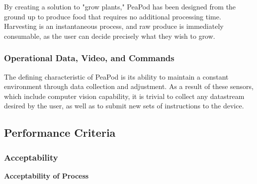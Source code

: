\documentclass{report}
\begin{document}

By creating a solution to "grow plants," PeaPod has been designed from the ground up to produce food that requires no additional processing time. Harvesting is an instantaneous process, and raw produce is immediately consumable, as the user can decide precisely what they wish to grow.

\subsubsection{Operational Data, Video, and Commands} 


The defining characteristic of PeaPod is its ability to maintain a constant environment through data collection and adjustment. As a result of these sensors, which include computer vision capability, it is trivial to collect any datastream desired by the user, as well as to submit new sets of instructions to the device.

\subsection{Performance Criteria}


\subsubsection{Acceptability}
\label{sec:acceptability}

\textbf{Acceptability of Process}
\label{sec:acceptability-process}
\end{document}
